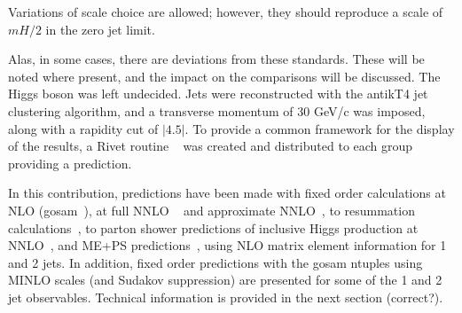 
Variations of scale choice are allowed; however, they should reproduce a scale of $mH/2$ in the zero jet 
limit. 


Alas, in some cases, there are deviations from these standards. These will be 
noted where present, and the impact on the comparisons will be discussed. 
The Higgs boson was left undecided. Jets were reconstructed with the antikT4 jet 
clustering algorithm, and a transverse momentum of 30 GeV/c was imposed, along with 
a rapidity cut of $|4.5|$. 
To provide a common framework for the display of the results, a Rivet routine ~\cite{Rivet_routine} was created and distributed to each group providing a prediction. 

In this contribution, predictions have been made with fixed order calculations at NLO 
(gosam~\cite{gosam}), at full NNLO ~\cite{Petriello} and approximate NNLO~\cite{LoopSim}, 
to resummation calculations~\cite{HqT, HEJ, etc}, to parton shower predictions of
inclusive Higgs production at NNLO~\cite{PowhegNNLOPS, SherpaNNLOPS}, and ME+PS
predictions~\cite{MG5,Sherpa,Herwig7}, using NLO matrix element information for 1 and 2
jets. In addition, fixed order predictions with the gosam ntuples using MINLO scales (and Sudakov suppression)  are presented for 
some of the 1 and 2 jet observables.  Technical information is provided in the next section (correct?). 
